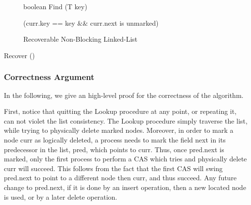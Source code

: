 \begin{figure}[h]
\begin{procedure}[H]
	\end{procedure}

	\begin{procedure}[H]
		\caption{boolean Find (T key)}
		
		
		\KwRet (curr.key == key $\&\&$ curr.next is unmarked)\;
		
	\end{procedure}

	
	\caption{Recoverable Non-Blocking Linked-List}
	\label{linked-list}
\end{figure}



\begin{procedure}[H]
	\caption{Recover ()}
	
	
\end{procedure}


\newpage
\subsubsection*{Correctness Argument}
In the following, we give an high-level proof for the correctness of the algorithm.

First, notice that quitting the Lookup procedure at any point, or repeating it, can not violet the list consistency. The Lookup procedure simply traverse the list, while trying to physically delete marked nodes. Moreover, in order to mark a node curr as logically deleted, a process needs to mark the field next in its predecessor in the list, pred, which points to curr. Thus, once pred.next is marked, only the first process to perform a CAS which tries and physically delete curr will succeed. This follows from the fact that the first CAS will swing pred.next to point to a different node then curr, and thus succeed. Any future change to pred.next, if it is done by an insert operation, then a new located node is used, or by a later delete operation.

